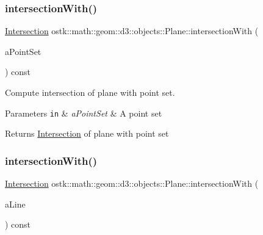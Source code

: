 \subsubsection{\texorpdfstring{intersection\+With()}{intersectionWith()}\hspace{0.1cm}{\footnotesize\ttfamily [2/5]}}
{\footnotesize\ttfamily \hyperlink{classostk_1_1math_1_1geom_1_1d3_1_1_intersection}{Intersection} ostk\+::math\+::geom\+::d3\+::objects\+::\+Plane\+::intersection\+With (\begin{DoxyParamCaption}\item[{const \hyperlink{classostk_1_1math_1_1geom_1_1d3_1_1objects_1_1_point_set}{Point\+Set} \&}]{a\+Point\+Set }\end{DoxyParamCaption}) const}



Compute intersection of plane with point set. 


\begin{DoxyParams}[1]{Parameters}
\mbox{\tt in}  & {\em a\+Point\+Set} & A point set \\
\hline
\end{DoxyParams}
\begin{DoxyReturn}{Returns}
\hyperlink{classostk_1_1math_1_1geom_1_1d3_1_1_intersection}{Intersection} of plane with point set 
\end{DoxyReturn}
\mbox{\label{classostk_1_1math_1_1geom_1_1d3_1_1objects_1_1_plane_aa85ba34c3f94fabf1e632f98fea48115}} 
\subsubsection{\texorpdfstring{intersection\+With()}{intersectionWith()}\hspace{0.1cm}{\footnotesize\ttfamily [3/5]}}
{\footnotesize\ttfamily \hyperlink{classostk_1_1math_1_1geom_1_1d3_1_1_intersection}{Intersection} ostk\+::math\+::geom\+::d3\+::objects\+::\+Plane\+::intersection\+With (\begin{DoxyParamCaption}\item[{const \hyperlink{classostk_1_1math_1_1geom_1_1d3_1_1objects_1_1_line}{Line} \&}]{a\+Line }\end{DoxyParamCaption}) const}



